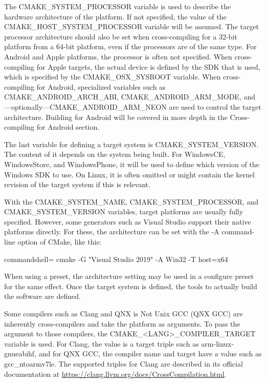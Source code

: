 The CMAKE\_SYSTEM\_PROCESSOR variable is used to describe the hardware architecture of the platform. If not specified, the value of the CMAKE\_HOST\_SYSTEM\_PROCESSOR variable will be assumed. The target processor architecture should also be set when cross-compiling for a 32-bit platform from a 64-bit platform, even if the processors are of the same type. For Android and Apple platforms, the processor is often not specified. When cross-compiling for Apple targets, the actual device is defined by the SDK that is used, which is specified by the CMAKE\_OSX\_SYSROOT variable. When cross-compiling for Android, specialized variables such as CMAKE\_ANDROID\_ARCH\_ABI, CMAKE\_ANDROID\_ARM\_MODE, and—optionally—CMAKE\_ANDROID\_ARM\_NEON are used to control the target architecture. Building for Android will be covered in more depth in the Cross-compiling for Android section.

The last variable for defining a target system is CMAKE\_SYSTEM\_VERSION. The content of it depends on the system being built. For WindowsCE, WindowsStore, and WindowsPhone, it will be used to define which version of the Windows SDK to use. On Linux, it is often omitted or might contain the kernel revision of the target system if this is relevant.

With the CMAKE\_SYSTEM\_NAME, CMAKE\_SYSTEM\_PROCESSOR, and CMAKE\_SYSTEM\_VERSION variables, target platforms are usually fully specified. However, some generators such as Visual Studio support their native platforms directly. For these, the architecture can be set with the -A command-line option of CMake, like this:

\begin{tcblisting}{commandshell={}}
cmake -G "Visual Studio 2019" -A Win32 -T host=x64
\end{tcblisting}

When using a preset, the architecture setting may be used in a configure preset for the same effect. Once the target system is defined, the tools to actually build the software are defined.

Some compilers such as Clang and QNX is Not Unix GCC (QNX GCC) are inherently cross-compilers and take the platform as arguments. To pass the argument to those compilers, the CMAKE\_<LANG>\_COMPILER\_TARGET variable is used. For Clang, the value is a target triple such as arm-linux-gnueabihf, and for QNX GCC, the compiler name and target have a value such as gcc\_ntoarmv7le. The supported triples for Clang are described in its official documentation at \url{https://clang.llvm.org/docs/CrossCompilation.html}.

